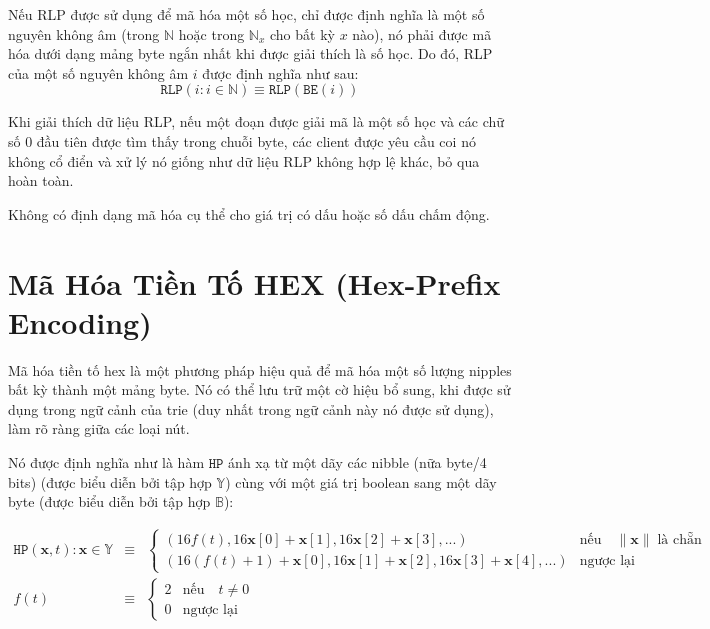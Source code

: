 \documentclass[9pt,oneside]{amsart}
\makeatletter
\newcommand{\linkdest}[1]{\Hy@raisedlink{\hypertarget{#1}{}}}
\makeatother
\begin{document}
Nếu RLP được sử dụng để mã hóa một số học, chỉ được định nghĩa là một số nguyên không âm (trong $\mathbb{N}$ hoặc trong $\mathbb{N}_x$ cho bất kỳ $x$ nào), nó phải được mã hóa dưới dạng mảng byte ngắn nhất khi được giải thích là số học. Do đó, RLP của một số nguyên không âm $i$ được định nghĩa như sau:
\begin{equation}
\mathtt{RLP}(i : i \in \mathbb{N}) \equiv \mathtt{RLP}(\mathtt{BE}(i))
\end{equation}

Khi giải thích dữ liệu RLP, nếu một đoạn được giải mã là một số học và các chữ số 0 đầu tiên được tìm thấy trong chuỗi byte, các client được yêu cầu coi nó không cổ điển và xử lý nó giống như dữ liệu RLP không hợp lệ khác, bỏ qua hoàn toàn.

Không có định dạng mã hóa cụ thể cho giá trị có dấu hoặc số dấu chấm động.

\section{Mã Hóa Tiền Tố HEX (Hex-Prefix Encoding)}\label{app:hexprefix}
Mã hóa tiền tố hex là một phương pháp hiệu quả để mã hóa một số lượng nipples bất kỳ thành một mảng byte. Nó có thể lưu trữ một cờ hiệu bổ sung, khi được sử dụng trong ngữ cảnh của trie (duy nhất trong ngữ cảnh này nó được sử dụng), làm rõ ràng giữa các loại nút.

Nó được định nghĩa như là hàm $\mathtt{HP}$ ánh xạ từ một dãy các nibble (nữa byte/4 bits) (được biểu diễn bởi tập hợp \linkdest{set_of_sequence_of_nibbles}$\mathbb{Y}$) cùng với một giá trị boolean sang một dãy byte (được biểu diễn bởi tập hợp $\mathbb{B}$):

\begin{eqnarray}
\mathtt{HP}(\mathbf{x}, t): \mathbf{x} \in \mathbb{Y} & \equiv & \begin{cases}
(16f(t), 16\mathbf{x}[0] + \mathbf{x}[1], 16\mathbf{x}[2] + \mathbf{x}[3], ...) &
\text{nếu} \quad \lVert \mathbf{x} \rVert \; \text{là chẵn} \\
(16(f(t) + 1) + \mathbf{x}[0], 16\mathbf{x}[1] + \mathbf{x}[2], 16\mathbf{x}[3] + \mathbf{x}[4], ...) &
\text{ngược lại}
\end{cases} \\
f(t) & \equiv & \begin{cases} 2 & \text{nếu} \quad t \neq 0 \\ 0 & \text{ngược lại} \end{cases}
\end{eqnarray}
\end{document}
